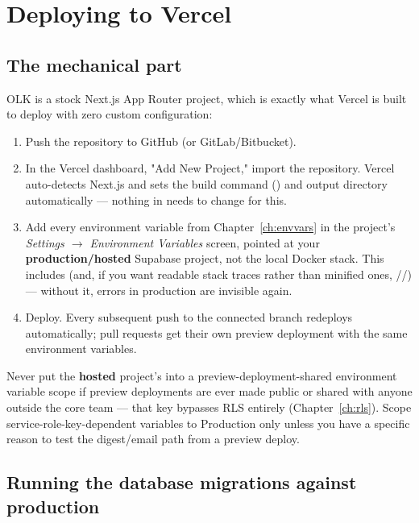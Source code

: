 \chapter{Deploying to Vercel}
\label{ch:vercel}

\section{The mechanical part}

OLK is a stock Next.js App Router project, which is exactly what Vercel is built to deploy with zero custom configuration:

\begin{enumerate}
  \item Push the repository to GitHub (or GitLab/Bitbucket).
  \item In the Vercel dashboard, "Add New Project," import the repository. Vercel auto-detects Next.js and sets the build command () and output directory automatically — nothing in  needs to change for this.
  \item Add every environment variable from Chapter~\ref{ch:envvars} in the project's \emph{Settings $\to$ Environment Variables} screen, pointed at your \textbf{production/hosted} Supabase project, not the local Docker stack. This includes  (and, if you want readable stack traces rather than minified ones, //) — without it, errors in production are invisible again.
  \item Deploy. Every subsequent push to the connected branch redeploys automatically; pull requests get their own preview deployment with the same environment variables.
\end{enumerate}

\begin{olkwarn}
Never put the \textbf{hosted} project's  into a preview-deployment-shared environment variable scope if preview deployments are ever made public or shared with anyone outside the core team — that key bypasses RLS entirely (Chapter~\ref{ch:rls}). Scope service-role-key-dependent variables to Production only unless you have a specific reason to test the digest/email path from a preview deploy.
\end{olkwarn}

\section{Running the database migrations against production}

